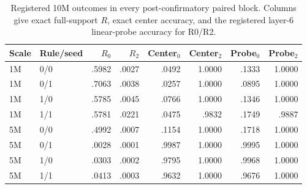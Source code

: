 \begin{table}[t]
\caption{Registered 10M outcomes in every post-confirmatory paired block.
Columns give exact full-support $R$, exact center accuracy, and the registered
layer-6 linear-probe accuracy for R0/R2.}
\label{tab:scale-robustness-metrics}
\centering
\small
\begin{tabular}{llrrrrrr}
\toprule
Scale & Rule/seed & $R_0$ & $R_2$ & Center$_0$ & Center$_2$ & Probe$_0$ & Probe$_2$ \\
\midrule
1M & 0/0 & .5982 & .0027 & .0492 & 1.0000 & .1333 & 1.0000 \\
1M & 0/1 & .7063 & .0038 & .0257 & 1.0000 & .0895 & 1.0000 \\
1M & 1/0 & .5785 & .0045 & .0766 & 1.0000 & .1346 & 1.0000 \\
1M & 1/1 & .5781 & .0221 & .0475 & .9832 & .1749 & .9887 \\
5M & 0/0 & .4992 & .0007 & .1154 & 1.0000 & .1718 & 1.0000 \\
5M & 0/1 & .0028 & .0001 & .9987 & 1.0000 & .9995 & 1.0000 \\
5M & 1/0 & .0303 & .0002 & .9795 & 1.0000 & .9968 & 1.0000 \\
5M & 1/1 & .0413 & .0003 & .9632 & 1.0000 & .9676 & 1.0000 \\
\bottomrule
\end{tabular}
\end{table}
